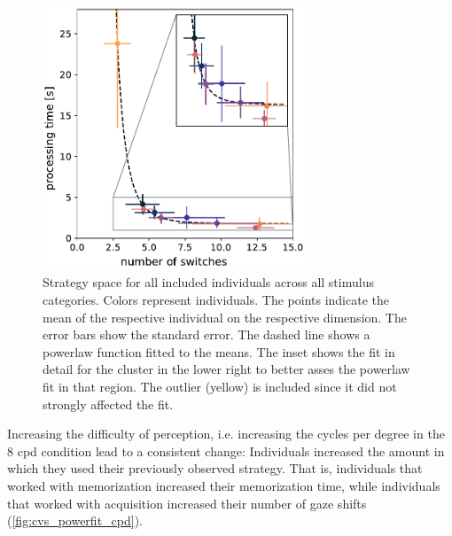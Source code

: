 \begin{figure}[h]
    \centering
    \includegraphics[width=0.7\textwidth]{Figures/cvs_all_powerfit.pdf} 
    \caption[Strategy space]{Strategy space for all included individuals across all stimulus categories. Colors represent individuals. The points indicate the mean of the respective individual on the respective dimension. The error bars show the standard error. The dashed line shows a powerlaw function fitted to the means. The inset shows the fit in detail for the cluster in the lower right to better asses the powerlaw fit in that region. The outlier (yellow) is included since it did not strongly affected the fit.}
    \label{fig:cvs_powerfit}
\end{figure}

Increasing the difficulty of perception, i.e. increasing the cycles per degree in the 8 cpd condition lead to a consistent change: Individuals increased the amount in which they used their previously observed strategy. That is, individuals that worked with memorization increased their memorization time, while individuals that worked with acquisition increased their number of gaze shifts (\ref{fig:cvs_powerfit_cpd}). 


